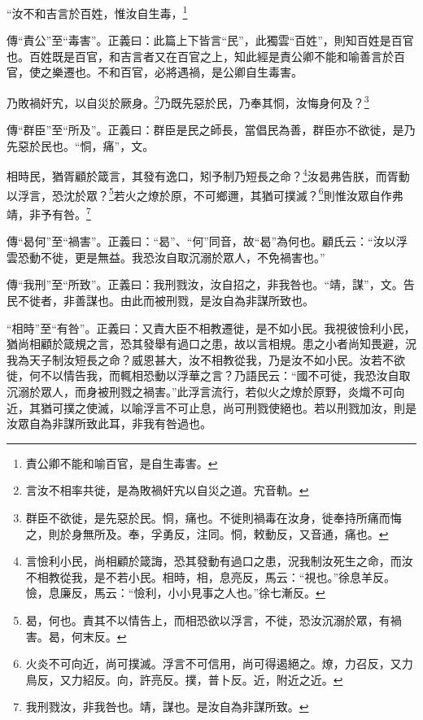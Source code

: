 “汝不和吉言於百姓，惟汝自生毒，\footnote{責公卿不能和喻百官，是自生毒害。}

{\noindent\zhuan{}\fzbyks 傳“責公”至“毒害”。正義曰：此篇上下皆言“民”，此獨雲“百姓”，則知百姓是百官也。百姓既是百官，和吉言者又在百官之上，知此經是責公卿不能和喻善言於百官，使之樂遷也。不和百官，必將遇禍，是公卿自生毒害。 \par}

乃敗禍奸宄，以自災於厥身。\footnote{言汝不相率共徙，是為敗禍奸宄以自災之道。宄音軌。}乃既先惡於民，乃奉其恫，汝悔身何及？\footnote{群臣不欲徙，是先惡於民。恫，痛也。不徙則禍毒在汝身，徙奉持所痛而悔之，則於身無所及。奉，孚勇反，注同。恫，敕動反，又音通，痛也。}

{\noindent\zhuan{}\fzbyks 傳“群臣”至“所及”。正義曰：群臣是民之師長，當倡民為善，群臣亦不欲徙，是乃先惡於民也。“恫，痛”，文。 \par}

相時民，猶胥顧於箴言，其發有逸口，矧予制乃短長之命？\footnote{言憸利小民，尚相顧於箴誨，恐其發動有過口之患，況我制汝死生之命，而汝不相教從我，是不若小民。相時，相，息亮反，馬云：“視也。”徐息羊反。憸，息廉反，馬云：“憸利，小小見事之人也。”徐七漸反。}汝曷弗告朕，而胥動以浮言，恐沈於眾？\footnote{曷，何也。責其不以情告上，而相恐欲以浮言，不徙，恐汝沉溺於眾，有禍害。曷，何末反。}若火之燎於原，不可鄉邇，其猶可撲滅？\footnote{火炎不可向近，尚可撲滅。浮言不可信用，尚可得遏絕之。燎，力召反，又力鳥反，又力紹反。向，許亮反。撲，普卜反。近，附近之近。}則惟汝眾自作弗靖，非予有咎。\footnote{我刑戮汝，非我咎也。靖，謀也。是汝自為非謀所致。}

{\noindent\zhuan{}\fzbyks 傳“曷何”至“禍害”。正義曰：“曷”、“何”同音，故“曷”為何也。顧氏云：“汝以浮雲恐動不徙，更是無益。我恐汝自取沉溺於眾人，不免禍害也。” \par}

{\noindent\zhuan{}\fzbyks 傳“我刑”至“所致”。正義曰：我刑戮汝，汝自招之，非我咎也。“靖，謀”，文。告民不徙者，非善謀也。由此而被刑戮，是汝自為非謀所致也。 \par}

{\noindent\shu{}\fzkt “相時”至“有咎”。正義曰：又責大臣不相教遷徙，是不如小民。我視彼憸利小民，猶尚相顧於箴規之言，恐其發舉有過口之患，故以言相規。患之小者尚知畏避，況我為天子制汝短長之命？威恩甚大，汝不相教從我，乃是汝不如小民。汝若不欲徙，何不以情告我，而輒相恐動以浮華之言？乃語民云：“國不可徙，我恐汝自取沉溺於眾人，而身被刑戮之禍害。”此浮言流行，若似火之燎於原野，炎熾不可向近，其猶可撲之使滅，以喻浮言不可止息，尚可刑戮使絕也。若以刑戮加汝，則是汝眾自為非謀所致此耳，非我有咎過也。 \par}

